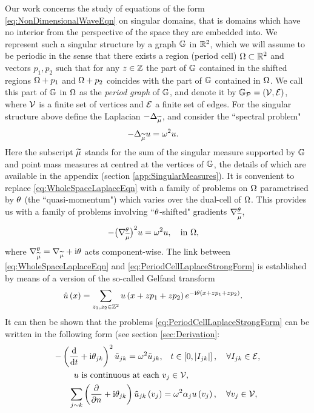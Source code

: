 Our work concerns the study of equations of the form \eqref{eq:NonDimensionalWaveEqn} on singular domains, that is domains which have no interior from the perspective of the space they are embedded into.
We represent such a singular structure by a graph $\mathbb{G}$ in $\mathbb{R}^2$, which we will assume to be periodic in the sense that there exists a region (period cell) $\Omega\subset\mathbb{R}^2$ and vectors $p_1, p_2$ such that for any $z\in\mathbb{Z}$ the part of $\mathbb{G}$ contained in the shifted regions $\Omega+p_1$ and $\Omega+p_2$ coincides with the part of $\mathbb{G}$ contained in $\Omega$.
We call this part of $\mathbb{G}$ in $\Omega$ as the \emph{period graph} of $\mathbb{G}$, and denote it by $\mathbb{G}_{\mathcal{P}}=\left( \mathcal{V}, \mathcal{E} \right)$, where $\mathcal{V}$ is a finite set of vertices and $\mathcal{E}$ a finite set of edges.
For the singular structure above define the Laplacian $-\Delta_{\widetilde{\mu}}$, and consider the ``spectral problem"
\begin{align} \label{eq:WholeSpaceLaplaceEqn}
	-\Delta_{\widetilde{\mu}} u &= \omega^2 u.
\end{align}
Here the subscript $\widetilde{\mu}$ stands for the sum of the singular measure supported by $\mathbb{G}$ and point mass measures at centred at the vertices of $\mathbb{G}$, the details of which are available in the appendix (section \ref{app:SingularMeasures}).
It is convenient to replace \eqref{eq:WholeSpaceLaplaceEqn} with a family of problems on $\Omega$ parametrised by $\theta$ (the ``quasi-momentum") which varies over the dual-cell of $\Omega$.
This provides us with a family of problems involving ``$\theta$-shifted" gradients $\nabla^{\theta}_{\widetilde{\mu}}$,
\begin{align} \label{eq:PeriodCellLaplaceStrongForm}
	-\bigl(\nabla^{\theta}_{\widetilde{\mu}}\bigr)^2 u &= \omega^2 u, \quad\text{in } \Omega,
\end{align}
where $\nabla^{\theta}_{\widetilde{\mu}} = \nabla_{\widetilde{\mu}} + \mathrm{i}\theta$ acts component-wise.
The link between \eqref{eq:WholeSpaceLaplaceEqn} and \eqref{eq:PeriodCellLaplaceStrongForm} is established by means of a version of the so-called Gelfand transform 
\begin{align*}
	\hat{u}\left( x \right) &= \sum_{z_1,z_2\in\mathbb{Z}^2}u\left( x+zp_1+zp_2 \right)e^{-\mathrm{i}\theta\left( x+zp_1+zp_2 \right)}.
\end{align*}
It can then be shown that the problems \eqref{eq:PeriodCellLaplaceStrongForm} can be written in the following form (see section \ref{sec:Derivation}:
\begin{subequations} \label{eq:QGFullSystem}
	\begin{align}
		-\left( \dfrac{\mathrm{d}}{\mathrm{d}t} + \mathrm{i}\theta_{jk} \right)^2 \tilde{u}_{jk} = \omega^2 \tilde{u}_{jk}, &\quad t\in\left[ 0,\left\lvert I_{jk} \right\rvert \right], \quad \forall I_{jk}\in \mathcal{E}, \label{eq:QGEdgeODEs} \\
		u \text{ is continuous at each } &v_j \in \mathcal{V}, \label{eq:QGVertCty}\\
		\sum_{j\sim k}\left( \dfrac{\partial }{\partial n} + \mathrm{i}\theta_{jk} \right)\tilde{u}_{jk}\left( v_j \right) &= \omega^2\alpha_{j}u\left( v_j \right), \quad \forall v_j \in \mathcal{V}, \label{eq:QGDerivCondition}
	\end{align}
\end{subequations}
